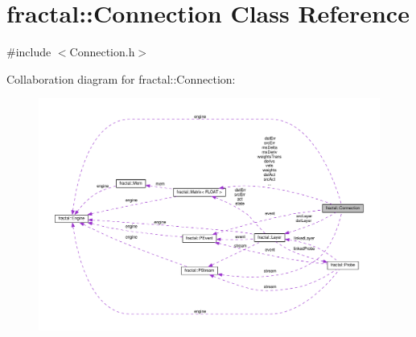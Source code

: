 \hypertarget{classfractal_1_1Connection}{\section{fractal\+:\+:Connection Class Reference}
\label{classfractal_1_1Connection}
}


{\ttfamily \#include $<$Connection.\+h$>$}



Collaboration diagram for fractal\+:\+:Connection\+:\nopagebreak
\begin{figure}[H]
\begin{center}
\leavevmode
\includegraphics[width=350pt]{db/d34/classfractal_1_1Connection__coll__graph}
\end{center}
\end{figure}
